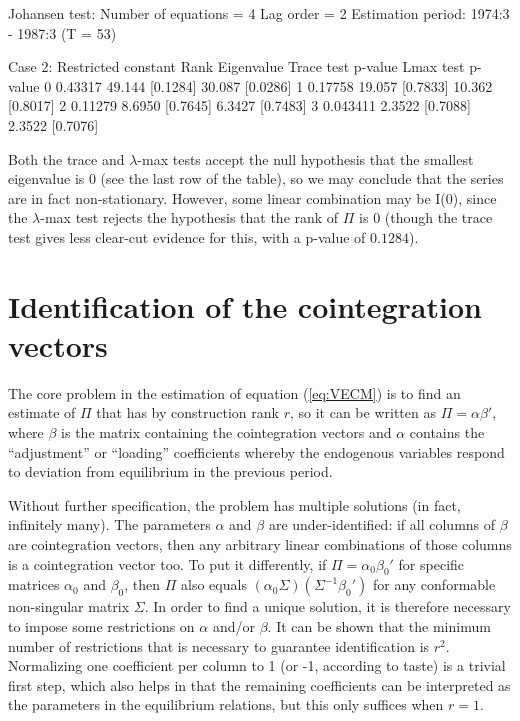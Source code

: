 \begin{center}
\begin{code}
Johansen test:
Number of equations = 4
Lag order = 2
Estimation period: 1974:3 - 1987:3 (T = 53)

Case 2: Restricted constant
Rank Eigenvalue Trace test p-value   Lmax test  p-value
   0    0.43317     49.144 [0.1284]     30.087 [0.0286]
   1    0.17758     19.057 [0.7833]     10.362 [0.8017]
   2    0.11279     8.6950 [0.7645]     6.3427 [0.7483]
   3   0.043411     2.3522 [0.7088]     2.3522 [0.7076]
\end{code}
\end{center}

Both the trace and $\lambda$-max tests accept the null hypothesis that
the smallest eigenvalue is 0 (see the last row of the table), so we
may conclude that the series are in fact non-stationary.  However,
some linear combination may be I(0), since the $\lambda$-max test
rejects the hypothesis that the rank of $\Pi$ is 0 (though the trace
test gives less clear-cut evidence for this, with a p-value of
$0.1284$).

\section{Identification of the cointegration vectors}
\label{sec:johansen-ident}

The core problem in the estimation of equation (\ref{eq:VECM}) is to
find an estimate of $\Pi$ that has by construction rank $r$, so it can
be written as $\Pi = \alpha \beta'$, where $\beta$ is the matrix
containing the cointegration vectors and $\alpha$ contains the
``adjustment'' or ``loading'' coefficients whereby the endogenous
variables respond to deviation from equilibrium in the previous period.

Without further specification, the problem has multiple solutions (in
fact, infinitely many). The parameters $\alpha$ and $\beta$ are
under-identified: if all columns of $\beta$ are cointegration vectors,
then any arbitrary linear combinations of those columns is a
cointegration vector too.  To put it differently, if $\Pi = \alpha_0
\beta_0'$ for specific matrices $\alpha_0$ and $\beta_0$, then $\Pi$
also equals $(\alpha_0 \Sigma)(\Sigma^{-1} \beta_0')$ for any conformable
non-singular matrix $\Sigma$.  In order to find a unique solution, it
is therefore necessary to impose some restrictions on $\alpha$ and/or
$\beta$. It can be shown that the minimum number of restrictions that
is necessary to guarantee identification is $r^2$. Normalizing one
coefficient per column to 1 (or -1, according to taste) is a trivial first
step, which also helps in that the remaining coefficients can be
interpreted as the parameters in the equilibrium relations, but this
only suffices when $r=1$.

